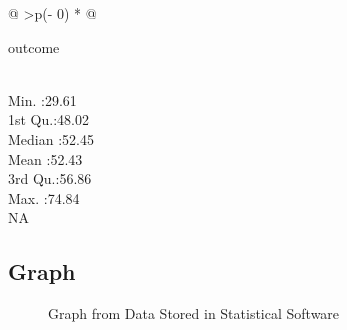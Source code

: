 \documentclass[
  letterpaper,
  DIV=11,
  numbers=noendperiod]{scrreprt}
\begin{document}
\begin{longtable}[]{@{}
  >{\centering\arraybackslash}p{(\columnwidth - 0\tabcolsep) * }@{}}

\caption{\label{tbl-descriptives}Descriptive Statistics}

\tabularnewline

\toprule\noalign{}
\begin{minipage}[b]{\linewidth}\centering
outcome
\end{minipage} \\
\midrule\noalign{}
\endhead
\bottomrule\noalign{}
\endlastfoot
Min. :29.61 \\
1st Qu.:48.02 \\
Median :52.45 \\
Mean :52.43 \\
3rd Qu.:56.86 \\
Max. :74.84 \\
NA \\

\end{longtable}

\subsection{Graph}\label{graph}

\begin{figure}


\caption{\label{fig-graph-statistical}Graph from Data Stored in
Statistical Software}

\end{figure}%
\end{document}
